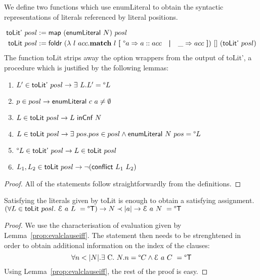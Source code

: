 \documentclass[a4paper,UKenglish,cleveref, autoref]{lipics-v2019}
\begin{document}
We define two functions which use \textsf{enumLiteral} to obtain the syntactic representations of literals referenced by literal positions.

\begin{align*}
  \textsf{toLit'}~posl &:= \textsf{map}~(\textsf{enumLiteral}~N)~posl \\
  \textsf{toLit}~posl &:= \textsf{foldr}~(\lambda~l~acc. \textbf{match}~ l ~\textbf{[}~ \degree a \Rightarrow a :: acc \quad\textbf{|}\quad \_ \Rightarrow acc ~\textbf{]})~[]~(\textsf{toLit'}~posl) 
\end{align*}
The function \textsf{toLit} strips away the option wrappers from the output of \textsf{toLit'}, a procedure which is justified by the following lemmas:

\begin{lemma}\leavevmode
  \begin{enumerate}
    \item $L' \in \normalfont\textsf{toLit'}~posl \rightarrow \exists~L. L' = \degree L$
    \item $p \in posl \rightarrow \normalfont\textsf{enumLiteral}~c~a \neq \emptyset$
    \item $L \in \normalfont\textsf{toLit}~posl \rightarrow L~\normalfont\textsf{inCnf}~N$
    \item $L \in \normalfont\textsf{toLit}~posl \rightarrow \exists~pos. pos \in posl \land \normalfont\textsf{enumLiteral}~N~pos = \degree L$
    \item $\degree L \in \normalfont\textsf{toLit'}~posl \rightarrow L \in \normalfont\textsf{toLit}~posl$
    \item $L_1, L_2 \in \normalfont\textsf{toLit}~posl \rightarrow \lnot (\normalfont\textsf{conflict}~L_1~L_2)$
  \end{enumerate}
\end{lemma}
\begin{proof}
  All of the statements follow straightforwardly from the definitions.
\end{proof}

\begin{lemma} Satisfying the literals given by \normalfont\textsf{toLit} is enough to obtain a satisfying assignment.
  $(\forall L \in \normalfont\textsf{toLit}~posl.~\mathcal{E}~a~L~ = \degree\mathsf{T}) \rightarrow N \prec |a| \rightarrow \mathcal{E}~a~N~ = \degree\mathsf{T}$
\end{lemma}
\begin{proof}
  We use the characterisation of evaluation given by Lemma~\ref{prop:evalclauseiff}. 
  The statement then needs to be strenghtened in order to obtain additional information on the index of the clauses:
  \[\forall n < \length{N}. \exists~$C$.~N.n = \Some{C} \land \eval{a}{C} = \Some{\btrue} \]
  Using Lemma~\ref{prop:evalclauseiff}, the rest of the proof is easy.
\end{proof}
\end{document}
